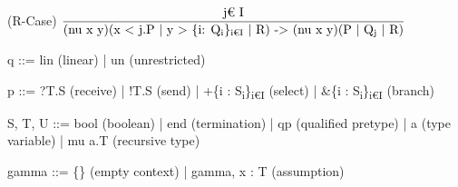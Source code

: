 \documentclass[landscape, a4paper]{article}
\begin{document}
\begin{minipage}[t]{0.195\linewidth}
\begin{betterlist}
\begin{betterlist}
			\item (R-Case) $\dfrac{\text{j€ I}}{\text{(nu x y)(x < j.P | y > \{i: Q\textsubscript{i}\}\textsubscript{i€I} | R) -> (nu x y)(P | Q\textsubscript{j} | R)}}$
		\end{betterlist}
		\item {}
		\begin{betterlist}
			\item {} q ::= lin (linear) | un (unrestricted)
			\item {} p ::= ?T.S (receive) | !T.S (send) | +\{i : S\textsubscript{i}\}\textsubscript{i€I} (select) | \&\{i : S\textsubscript{i}\}\textsubscript{i€I} (branch)
			\item {} S, T, U ::= bool (boolean) | end (termination) | qp (qualified pretype) | a (type variable) | mu a.T (recursive type)
			\item {} gamma ::= \{\} (empty context) | gamma, x : T (assumption)
		\end{betterlist}
	\end{betterlist}
\end{minipage}
\end{document}
